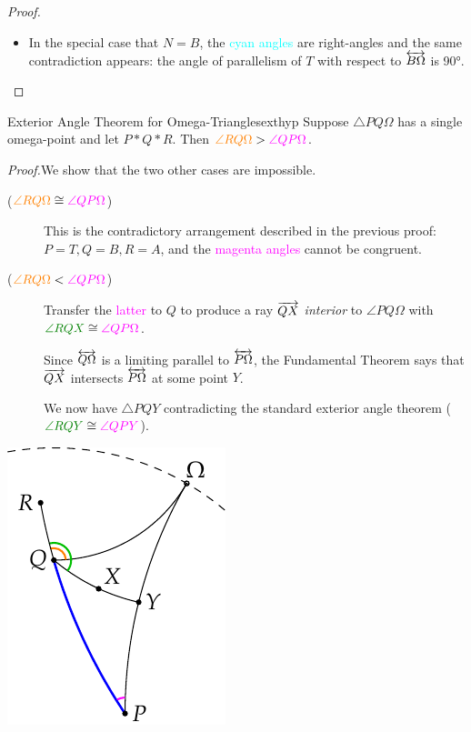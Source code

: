 \begin{proof}
\begin{minipage}[t]{0.29\linewidth}
	\end{minipage}\par
	\begin{itemize}
	  \item In the special case that $N=B$, the \textcolor{cyan}{cyan angles} are right-angles and the same contradiction appears: the angle of parallelism of $T$ with respect to $\overleftrightarrow{B\Omega}$ is \ang{90}.\qedhere
	\end{itemize}
\end{proof}

\goodbreak


\begin{thm}{Exterior Angle Theorem for Omega-Triangles}{exthyp}
	Suppose $\triangle PQ\Omega$ has a single omega-point and let $P*Q*R$. Then $\textcolor{orange}{\angle RQ\Omega}>\textcolor{Magenta}{\angle QP\Omega}$.
\end{thm}

\begin{tcolorbox}[proofstyle, lower separated=false, sidebyside, sidebyside align=top seam, sidebyside gap=0pt, righthand width=0.27\linewidth]
	\emph{Proof.}\quad We show that the two other cases are impossible.
	\begin{description}
	  \item[\normalfont ($\textcolor{orange}{\angle RQ\Omega}\cong\textcolor{Magenta}{\angle QP\Omega}$)] This is the contradictory arrangement described in the previous proof: $P=T,Q=B,R=A$, and the \textcolor{Magenta}{magenta angles} cannot be congruent.
		\item[\normalfont ($\textcolor{orange}{\angle RQ\Omega}<\textcolor{Magenta}{\angle QP\Omega}$)] Transfer the \textcolor{Magenta}{latter} to $Q$ to produce a ray $\overrightarrow{QX}$ \emph{interior} to $\angle PQ\Omega$ with $\textcolor{Green}{\angle RQX}\cong \textcolor{Magenta}{\angle QP\Omega}$.\par
	Since $\overleftrightarrow{Q\Omega}$ is a limiting parallel to $\overleftrightarrow{P\Omega}$, the Fundamental Theorem says that $\overrightarrow{QX}$ intersects $\overleftrightarrow{P\Omega}$ at some point $Y$.\par
	We now have $\triangle PQY$ contradicting the standard exterior angle theorem ($\textcolor{Green}{\angle RQY}\cong \textcolor{Magenta}{\angle QPY}$).
	\end{description}
	\tcblower
	\flushright\includegraphics{basic-ext4}\\\hfil\qedsymbol
\end{tcolorbox}

